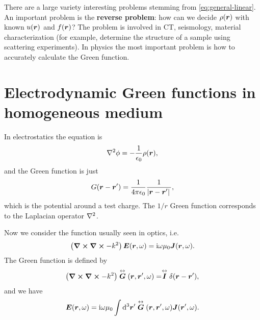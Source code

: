 \documentclass[hyperref, a4paper]{article}
\newcommand*{\ii}{\mathrm{i}}
\renewcommand{\tensor}[1]{ \stackrel{\leftrightarrow}{\vb*{#1}}}
\newcommand*{\concept}[1]{{\textbf{#1}}}
\begin{document}
There are a large variety interesting problems stemming from \eqref{eq:general-linear}.
An important problem is the \concept{reverse problem}: how can we decide $\rho(\vb*{r})$ with known $u(\vb*{r})$ and $f(\vb*{r})$?
The problem is involved in CT, seismology, material characterization (for example, determine the structure of a sample using scattering experiments).
In physics the most important problem is how to accurately calculate the Green function.

\section{Electrodynamic Green functions in homogeneous medium}

In electrostatics the equation is 
\begin{equation}
    \laplacian \phi = - \frac{1}{\epsilon_0} \rho(\vb*{r}),
\end{equation}
and the Green function is just 
\begin{equation}
    G(\vb*{r} - \vb*{r}') = \frac{1}{4 \pi \epsilon_0} \frac{1}{\abs*{\vb*{r} - \vb*{r}'}},
\end{equation}
which is the potential around a test charge.
The $1/r$ Green function corresponds to the Laplacian operator $\laplacian$.

Now we consider the function usually seen in optics, i.e.
\begin{equation}
    \left( \curl \curl - k^2 \right) \vb*{E}(\vb*{r}, \omega) = \ii \omega \mu_0 \vb*{J}(\vb*{r}, \omega).
\end{equation}
The Green function is defined by 
\begin{equation}
    \left( \curl \curl - k^2 \right) \tensor{G}(\vb*{r}, \vb*{r}', \omega) = \tensor{I} \delta(\vb*{r} - \vb*{r}'),
    \label{eq:e-green-def}
\end{equation}
and we have 
\begin{equation}
    \vb*{E}(\vb*{r}, \omega) = \ii \omega \mu_0 \int \dd[3]{\vb*{r}'} \tensor{G}(\vb*{r}, \vb*{r}', \omega) \vb*{J}(\vb*{r}', \omega).
    \label{eq:e-from-e-green}
\end{equation}
\end{document}
